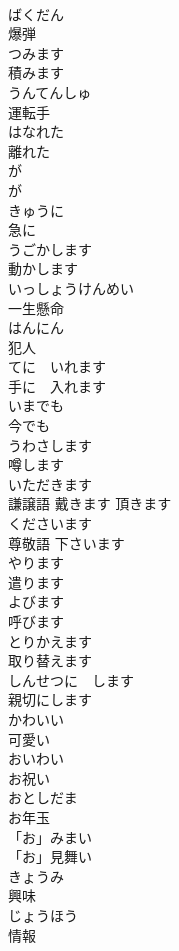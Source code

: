 \documentclass[8pt]{extreport}
\begin{document}
\begin{CJK}{UTF8}{min}
\\	ばくだん	
\\	爆弾		
\\	つみます	
\\	積みます		
\\	うんてんしゅ	
\\	運転手		
\\	はなれた	
\\	離れた		
\\	が 
\\	が 
\\	きゅうに	
\\	急に		
\\	うごかします	
\\	動かします		
\\	いっしょうけんめい	
\\	一生懸命		
\\	はんにん	
\\	犯人		
\\	てに　いれます	
\\	手に　入れます		
\\	いまでも	
\\	今でも		
\\	うわさします	
\\	噂します		
\\	いただきます	
\\	謙譲語	戴きます 頂きます	
\\	くださいます	
\\	尊敬語	下さいます	
\\	やります	
\\	遣ります	
\\	よびます	
\\	呼びます	
\\	とりかえます	
\\	取り替えます	
\\	しんせつに　します	
\\	親切にします	
\\	かわいい	
\\	可愛い	
\\	おいわい	
\\	お祝い	
\\	おとしだま	
\\	お年玉		
\\	「お」みまい	
\\	「お」見舞い		
\\	きょうみ	
\\	興味	
\\	じょうほう	
\\	情報	

\end{CJK}
\end{document}
